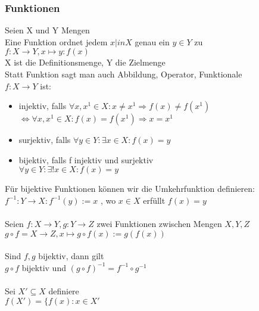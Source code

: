 \documentclass{article}
\begin{document}
	\subsubsection{Funktionen}
	Seien X und Y Mengen\\
	Eine Funktion ordnet jedem $x |in X$ genau ein $y \in Y$ zu\\
	\tabto{5cm} $f: X \to Y, x \mapsto y : f(x)$\\
	X ist die Definitionsmenge, Y die Zielmenge\\
	Statt Funktion sagt man auch Abbildung, Operator, Funktionale\\
	$f: X \to Y$ ist:
	\begin{itemize}
	\item injektiv, falls \tabto{2.2cm} $\forall x, x^1 \in X: x \neq x^1 \Rightarrow f(x) \neq f(x^1)$\\
	\tabto{1.8cm} $\Leftrightarrow \forall x, x^1 \in X: f(x) = f(x^1) \Rightarrow x = x^1$
	\item surjektiv, falls $\forall y \in Y: \exists x \in X: f(x) = y$
	\item bijektiv, falls f injektiv und surjektiv \\
	\tabto{2cm} $\forall y \in Y: \exists! x \in X: f(x)=y$
	\end{itemize}
	Für bijektive Funktionen können wir die Umkehrfunktion definieren:
	\tabto{2cm} $f^{-1} : Y \to X: f^{-1} (y) := x$ , wo $x \in X$ erfüllt $f(x) = y$\\\\
	Seien $f: X \to Y, g: Y \to Z$ zwei Funktionen zwischen Mengen $X, Y, Z$\\
	\tabto{2cm} $g \circ f = X \to Z, x \mapsto g \circ f(x) := g(f(x))$\\\\
	Sind $f, g$ bijektiv, dann gilt \\
	\tabto{2cm} $g \circ f$ bijektiv und $(g \circ f)^{-1} = f^{-1} \circ g^{-1}$ \\\\
	Sei $X' \subseteq X$ definiere \\
	\tabto{2cm} $f(X') = \{f(x): x \in X'$\\
	
\end{document}

